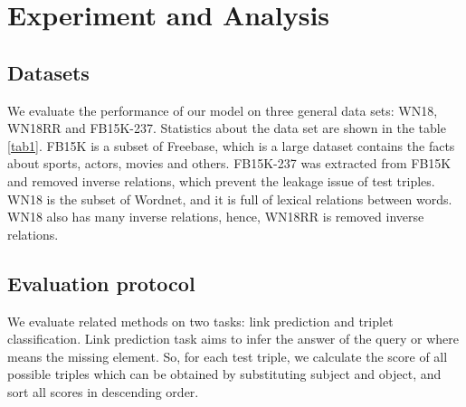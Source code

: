 \documentclass[letterpaper]{article} \usepackage{aaai20}  \usepackage{times}  \usepackage{helvet} \usepackage{courier}  \usepackage[hyphens]{url}  \usepackage{graphicx} \usepackage{lineno,hyperref,amsmath,amssymb}
\begin{document}
\section{Experiment and Analysis}

\subsection{Datasets}
We evaluate the performance of our model on three general data sets: WN18, WN18RR and FB15K-237. Statistics about the data set are shown in the table \ref{tab1}. FB15K\cite{bordes2013translating} is a subset of Freebase, which is a large dataset contains the facts about sports, actors, movies and others. FB15K-237\cite{toutanova2015observed} was extracted from FB15K and removed inverse relations, which prevent the leakage issue of test triples. WN18\cite{bordes2013translating} is the subset of Wordnet, and it is full of lexical relations between words. WN18 also has many inverse relations, hence, WN18RR\cite{dettmers2018convolutional} is removed inverse relations.

\begin{table}[h]
\centering
{}
\caption{\textbf{statistics about the experimental datasets.}}
\label{tab1}
\end{table}

\subsection{Evaluation protocol}

We evaluate related methods on two tasks: link prediction and triplet classification. Link prediction task aims to infer the answer of the query  or  where  means the missing element. So, for each test triple, we calculate the score of all possible triples which can be obtained by substituting subject and object, and sort all scores in descending order.
\end{document}
